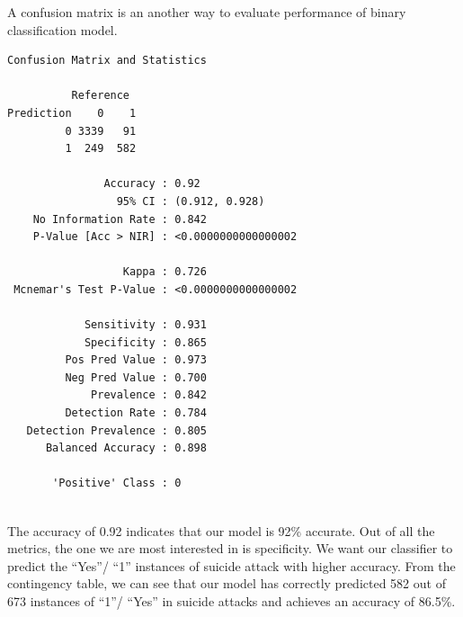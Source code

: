\documentclass[11pt,oneside,a4paper]{reedthesis}
\newenvironment{Shaded}{\begin{snugshade}}{\end{snugshade}}
\newcommand{\KeywordTok}[1]{\textcolor[rgb]{0.13,0.29,0.53}{\textbf{#1}}}
\newcommand{\DataTypeTok}[1]{\textcolor[rgb]{0.13,0.29,0.53}{#1}}
\newcommand{\DecValTok}[1]{\textcolor[rgb]{0.00,0.00,0.81}{#1}}
\newcommand{\FloatTok}[1]{\textcolor[rgb]{0.00,0.00,0.81}{#1}}
\newcommand{\StringTok}[1]{\textcolor[rgb]{0.31,0.60,0.02}{#1}}
\newcommand{\CommentTok}[1]{\textcolor[rgb]{0.56,0.35,0.01}{\textit{#1}}}
\newcommand{\OperatorTok}[1]{\textcolor[rgb]{0.81,0.36,0.00}{\textbf{#1}}}
\newcommand{\NormalTok}[1]{#1}
\begin{document}
A confusion matrix is an another way to evaluate performance of binary
classification model.
\begin{Shaded}
\end{Shaded}
\begin{verbatim}
Confusion Matrix and Statistics

          Reference
Prediction    0    1
         0 3339   91
         1  249  582
                                             
               Accuracy : 0.92               
                 95% CI : (0.912, 0.928)     
    No Information Rate : 0.842              
    P-Value [Acc > NIR] : <0.0000000000000002
                                             
                  Kappa : 0.726              
 Mcnemar's Test P-Value : <0.0000000000000002
                                             
            Sensitivity : 0.931              
            Specificity : 0.865              
         Pos Pred Value : 0.973              
         Neg Pred Value : 0.700              
             Prevalence : 0.842              
         Detection Rate : 0.784              
   Detection Prevalence : 0.805              
      Balanced Accuracy : 0.898              
                                             
       'Positive' Class : 0                  
                                             
\end{verbatim}
The accuracy of 0.92 indicates that our model is 92\% accurate. Out of
all the metrics, the one we are most interested in is specificity. We
want our classifier to predict the ``Yes''/ ``1'' instances of suicide
attack with higher accuracy. From the contingency table, we can see that
our model has correctly predicted 582 out of 673 instances of ``1''/
``Yes'' in suicide attacks and achieves an accuracy of 86.5\%.
\end{document}
